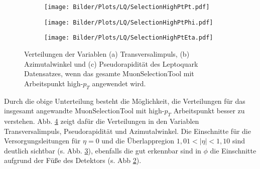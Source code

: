 \begin{figure}
  \begin{subfigure}[t]{0.55\textwidth}
  \texttt{[image: Bilder/Plots/LQ/SelectionHighPtPt.pdf]}
  \label{PtSelectionHighPt}
  \end{subfigure}
\begin{subfigure}[t]{0.55\textwidth}
 \texttt{[image: Bilder/Plots/LQ/SelectionHighPtPhi.pdf]}
  \label{PhiSelectionHighPt}
\end{subfigure}
\begin{subfigure}[t]{0.55\textwidth}
  \texttt{[image: Bilder/Plots/LQ/SelectionHighPtEta.pdf]}
  \label{EtaSelectionHighPt}
\end{subfigure}
\caption{Verteilungen der Variablen (a) Transversalimpuls, (b) Azimutalwinkel und (c) Pseudorapidität des Leptoquark Datensatzes, wenn das gesamte MuonSelectionTool mit Arbeitspunkt high-$p_T$ angewendet wird.}
\label{PtEtaPhiSelectionHighPt}
\end{figure}
Durch die obige Unterteilung besteht die Möglichkeit, die Verteilungen für das insgesamt angewandte MuonSelectionTool mit high-$p_T$ Arbeitspunkt besser zu verstehen. Abb. \ref{PtEtaPhiSelectionHighPt} zeigt dafür die Verteilungen in den Variablen Transversalimpuls, Pseudorapidität und Azimutalwinkel. Die Einschnitte für die Versorgungsleitungen für $\eta=0$ und die Überlappregion $1,01<|\eta|<1,10$ sind deutlich sichtbar (s. Abb. \ref{EtaSelectionHighPt}), ebenfalls die gut erkennbar sind in $\phi$ die Einschnitte aufgrund der Füße des Detektors (s. Abb \ref{PhiSelectionHighPt}).

